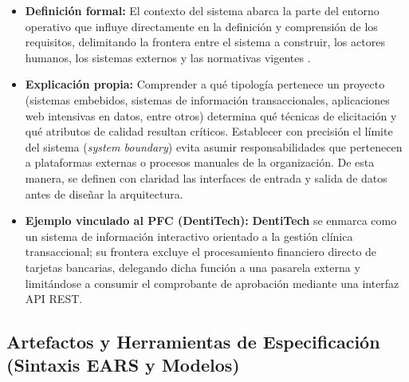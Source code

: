 \documentclass[11pt,a4paper]{article}
\begin{document}
\begin{itemize}
    \item \textbf{Definición formal:} El contexto del sistema abarca la parte del entorno operativo que influye directamente en la definición y comprensión de los requisitos, delimitando la frontera entre el sistema a construir, los actores humanos, los sistemas externos y las normativas vigentes \cite{ieee15288, ieee12207, pohl2025}.
    \item \textbf{Explicación propia:} Comprender a qué tipología pertenece un proyecto (sistemas embebidos, sistemas de información transaccionales, aplicaciones web intensivas en datos, entre otros) determina qué técnicas de elicitación y qué atributos de calidad resultan críticos. Establecer con precisión el límite del sistema (\textit{system boundary}) evita asumir responsabilidades que pertenecen a plataformas externas o procesos manuales de la organización. De esta manera, se definen con claridad las interfaces de entrada y salida de datos antes de diseñar la arquitectura.
    \item \textbf{Ejemplo vinculado al PFC (DentiTech):} \textbf{DentiTech} se enmarca como un sistema de información interactivo orientado a la gestión clínica transaccional; su frontera excluye el procesamiento financiero directo de tarjetas bancarias, delegando dicha función a una pasarela externa y limitándose a consumir el comprobante de aprobación mediante una interfaz API REST.
\end{itemize}

\subsection{Artefactos y Herramientas de Especificación (Sintaxis EARS y Modelos)}
\end{document}
